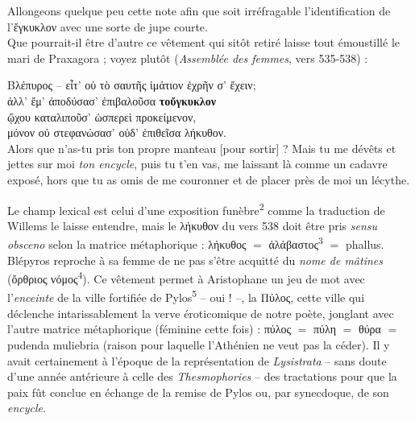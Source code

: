 \documentclass[12pt]{book}%
\newcommand{\italique}[1]{\textit{#1}}%
\newcommand{\citComm}[1]{\begin{quoting}[vskip=0pt] #1 \end{quoting}}%
\newcommand{\latin}[1]{{\policeLat #1}}%
\newcommand{\marqueur}[1]{\textsuperscript{#1}}%
\newenvironment{groupe}{%
\pstart%
\ledgroup%
}{%
\pend %
}%
\begin{document}
\begin{pages}
\begin{Leftside}
\begin{groupe}
{{%
Allongeons quelque peu cette note afin que soit irréfragable l'identification de l'ἔγκυκλον avec une sorte de jupe courte.\\
Que pourrait-il être d'autre ce vêtement qui sitôt retiré laisse tout émoustillé le mari de Praxagora ; voyez plutôt (\italique{Assemblée des femmes}, vers 535-538) :%
\citComm{Βλέπυρος -- εἶτ' οὐ τὸ σαυτῆς ἱμάτιον ἐχρῆν σ' ἔχειν;\\
ἀλλ' ἔμ' ἀποδύσασ' ἐπιβαλοῦσα \textbf{τοὔγκυκλον}\\
ᾤχου καταλιποῦσ' ὡσπερεὶ προκείμενον,\\
μόνον οὐ στεφανώσασ' οὐδ' ἐπιθεῖσα λήκυθον.\\
Alors que n'as-tu pris ton propre manteau [pour sortir] ? Mais tu me dévêts et jettes sur moi \italique{ton encycle}, puis tu t'en vas, me laissant là comme un cadavre exposé, hors que tu as omis de me couronner et de placer près de moi un lécythe.}%
Le champ lexical est celui d'une exposition funèbre\marqueur{2} comme la traduction de Willems le laisse entendre, mais le λήκυθον du vers 538 doit être pris \italique{sensu obsceno} selon la matrice métaphorique : λήκυθος $=$ ἀλάβαστος\marqueur{3} $=$ \latin{phallus}.
Blépyros reproche à sa femme de ne pas s'être acquitté du \italique{nome de mâtines} (ὄρθριος νόμος\marqueur{4}).
Ce vêtement permet à Aristophane un jeu de mot avec l'\italique{enceinte} de la ville fortifiée de Pylos\marqueur{5} -- oui ! --, la Πύλος, cette ville qui déclenche intarissablement la verve éroticomique de notre poète, jonglant avec l'autre matrice métaphorique (féminine cette fois) : πύλος $=$ πύλη $=$ θύρα $=$ \latin{pudenda muliebria} (raison pour laquelle l'Athénien ne veut pas la céder). 
Il y avait certainement à l'époque de la représentation de \italique{Lysistrata} -- sans doute d'une année antérieure à celle des \italique{Thesmophories} -- des tractations pour que la paix fût conclue en échange de la remise de Pylos ou, par synecdoque, de son \italique{encycle}. 
}}
\end{groupe}
\end{Leftside}
\end{pages}
\end{document}
